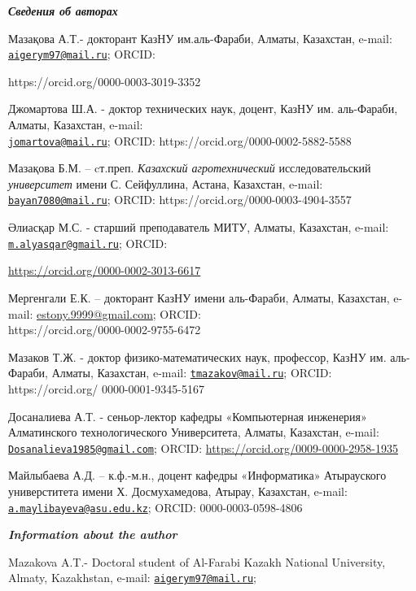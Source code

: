\begin{authorinfo}
\emph{{\bfseries Сведения об авторах}}

Мазақова А.Т.- докторант КазНУ им.аль-Фараби, Алматы, Казахстан, e-mail:
\href{mailto:aigerym97@mail.ru}{\nolinkurl{aigerym97@mail.ru}}; ORCID:

https://orcid.org/0000-0003-3019-3352

Джомартова Ш.А. - доктор технических наук, доцент, КазНУ им. аль-Фараби,
Алматы, Казахстан, e-mail:\\
\href{mailto:jomartova@mail.ru}{\nolinkurl{jomartova@mail.ru}}; ORCID:
https://orcid.org/0000-0002-5882-5588

Мазақова Б.М. -- cт.преп. \emph{Казахский агротехнический}
исследовательский \emph{университет} имени С. Сейфуллина, Астана,
Казахстан, e-mail:
\href{mailto:bayan7080@mail.ru}{\nolinkurl{bayan7080@mail.ru}};
ORCID: https://orcid.org/0000-0003-4904-3557

Әлиасқар М.С. - старший преподаватель МИТУ, Алматы, Казахстан, e-mail:
\href{mailto:m.alyasqar@gmail.ru}{\nolinkurl{m.alyasqar@gmail.ru}};
ORCID:

\href{https://orcid.org/0000-0002-3013-6617}{https://orcid.org/0000-0002-3013-6617}

Мергенгали Е.К. -- докторант КазНУ имени аль-Фараби, Алматы, Казахстан,
e-mail:
\href{https://e.mail.ru/compose/?mailto=mailto\%3aestony.9999@gmail.com}{estony.9999@gmail.com};
ORCID: \\https://orcid.org/0000-0002-9755-6472

Мазаков Т.Ж. - доктор физико-математических наук, профессор, КазНУ им.
аль-Фараби, Алматы, Казахстан, e-mail:
\href{mailto:tmazakov@mail.ru}{\nolinkurl{tmazakov@mail.ru}}; ORCID:
https://orcid.org/ 0000-0001-9345-5167

Досаналиева А.Т. - сеньор-лектор кафедры «Компьютерная инженерия»
Алматинского технологического Университета, Алматы, Казахстан, e-mail:
\href{mailto:Dosanalieva1985@gmail.com}{\nolinkurl{Dosanalieva1985@gmail.com}};
ORCID: \url{https://orcid.org/0009-0000-2958-1935}

Майлыбаева А.Д. -- к.ф.-м.н., доцент кафедры «Информатика» Атырауского
универститета имени Х. Досмухамедова, Атырау, Казахстан, e-mail:
\href{mailto:a.maylibayeva@asu.edu.kz}{\nolinkurl{a.maylibayeva@asu.edu.kz}};
ORCID: 0000-0003-0598-4806

\emph{{\bfseries Information about the author}}

Mazakova A.T.- Doctoral student of Al-Farabi Kazakh National University,
Almaty, Kazakhstan, e-mail:
\href{mailto:aigerym97@mail.ru}{\nolinkurl{aigerym97@mail.ru}};


\end{authorinfo}
